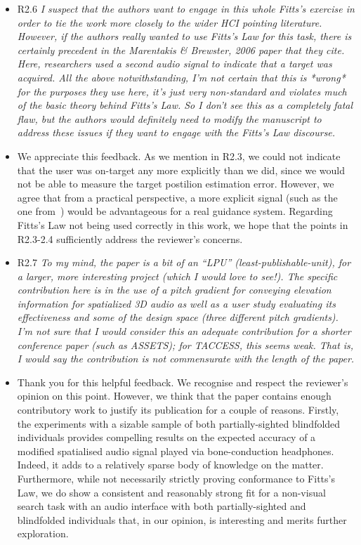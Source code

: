 \documentclass{scrartcl}
\begin{document}
\begin{itemize}
  \item R2.6 \textit{I suspect that the authors want to engage in this whole Fitts’s exercise in order to tie the work more closely to the wider HCI pointing literature. However, if the authors really wanted to use Fitts’s Law for this task, there is certainly precedent in the Marentakis \& Brewster, 2006 paper that they cite. Here, researchers used a second audio signal to indicate that a target was acquired.
    All the above notwithstanding, I’m not certain that this is *wrong* for the purposes they use here, it’s just very non-standard and violates much of the basic theory behind Fitts’s Law. So I don’t see this as a completely fatal flaw, but the authors would definitely need to modify the manuscript to address these issues if they want to engage with the Fitts’s Law discourse.}
  \item We appreciate this feedback.
    As we mention in R2.3, we could not indicate that the user was on-target any more explicitly than we did, since we would not be able to measure the target postilion estimation error.
    However, we agree that from a practical perspective, a more explicit signal (such as the one from~\cite{marentakis2005comparison}) would be advantageous for a real guidance system.
    Regarding Fitts's Law not being used correctly in this work, we hope that the points in R2.3-2.4 sufficiently address the reviewer's concerns.

  \item R2.7 \textit{To my mind, the paper is a bit of an ``LPU'' (least-publishable-unit), for a larger, more interesting project (which I would love to see!). The specific contribution here is in the use of a pitch gradient for conveying elevation information for spatialized 3D audio as well as a user study evaluating its effectiveness and some of the design space (three different pitch gradients). I’m not sure that I would consider this an adequate contribution for a shorter conference paper (such as ASSETS); for TACCESS, this seems weak. That is, I would say the contribution is not commensurate with the length of the paper.}
  \item[] Thank you for this helpful feedback.
    We recognise and respect the reviewer's opinion on this point.
    However, we think that the paper contains enough contributory work to justify its publication for a couple of reasons.
    Firstly, the experiments with a sizable sample of both partially-sighted blindfolded individuals provides compelling results on the expected accuracy of a modified spatialised audio signal played via bone-conduction headphones.
    Indeed, it adds to a relatively sparse body of knowledge on the matter.
    Furthermore, while not necessarily strictly proving conformance to Fitts's Law, we do show a consistent and reasonably strong fit for a non-visual search task with an audio interface with both partially-sighted and blindfolded individuals that, in our opinion, is interesting and merits further exploration.

\end{itemize}
\end{document}
